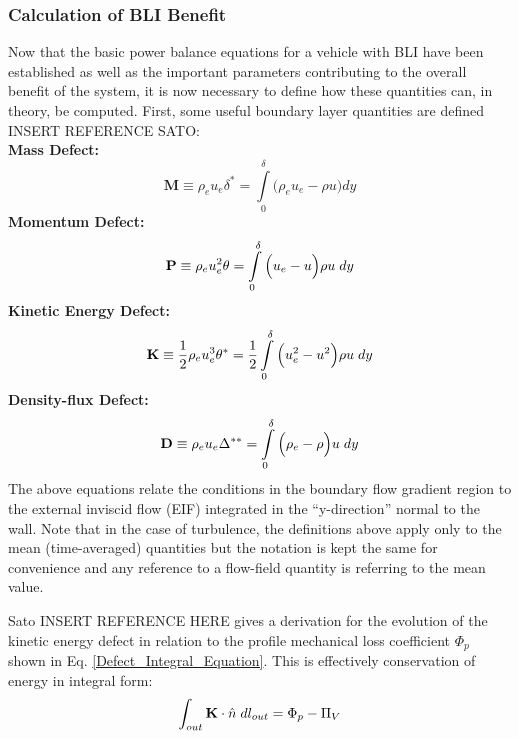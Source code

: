 				\subsubsection{Calculation of BLI Benefit}					
					Now that the basic power balance equations for a vehicle with BLI have been established as well as the important parameters contributing to the overall benefit of the system, it is now necessary to define how these quantities can, in theory, be computed.  First, some useful boundary layer quantities are defined INSERT REFERENCE SATO:	\\			
					\textbf{Mass Defect:}						
						\begin{equation}
							\textbf{M} \equiv \rho_e u_e \delta^* = \int \limits_{0}^{\delta}\Big(\rho_e u_e - \rho u \Big)dy
							\label{M_Definition}
						\end{equation}						
					\textbf{Momentum Defect:}
						\begin{equation}
							\textbf{P} \equiv \rho_e u_e^2 \theta = \int \limits_{0}^{\delta}\Big(u_e-u\Big)\rho u \hspace{1mm} dy
						\end{equation}					
					\textbf{Kinetic Energy Defect:}
						\begin{equation}
							\textbf{K} \equiv \frac{1}{2}\rho_e u_e^3 \theta^* = \frac{1}{2} \int \limits_{0}^{\delta}\Big(u_e^2-u^2\Big)\rho u \hspace{1mm} dy
						\end{equation}										
					\textbf{Density-flux Defect:}
						\begin{equation}
							\textbf{D} \equiv \rho_e u_e \Delta^{**} = \int \limits_{0}^{\delta}\Big(\rho_e - \rho \Big) u \hspace{1mm} dy
						\end{equation}					
					The above equations relate the conditions in the boundary flow gradient region to the external inviscid flow (EIF) integrated in the ``y-direction'' normal to the wall.  Note that in the case of turbulence, the definitions above apply only to the mean (time-averaged) quantities but the notation is kept the same for convenience and any reference to a flow-field quantity is referring to the mean value.
					
					Sato INSERT REFERENCE HERE gives a derivation for the evolution of the kinetic energy defect in relation to the profile mechanical loss coefficient $\Phi_p$ shown in Eq. \ref{Defect_Integral_Equation}.  This is effectively conservation of energy in integral form:				
					\begin{equation}
						\int_{out} \textbf{K} \cdot \hat{n} \hspace{1mm} dl_{out} = \Phi_p - \Pi_V
						\label{Defect_Integral_Equation}
					\end{equation}
					
